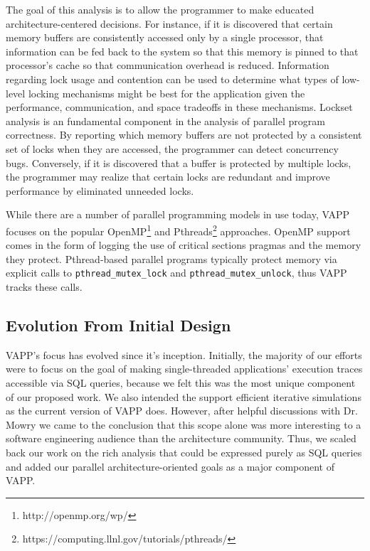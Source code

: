 The goal of this analysis is to allow the programmer to make
educated architecture-centered decisions.  For instance, if
it is discovered that certain memory buffers are consistently
accessed only by a single processor, that information can be
fed back to the system so that this memory is pinned to that
processor's cache so that communication overhead is reduced.
Information regarding lock usage and contention can be
used to determine what types of low-level locking mechanisms
might be best for the application given the performance, 
communication, and space tradeoffs in these mechanisms.
Lockset analysis is an fundamental component in the analysis
of parallel program correctness.  By reporting which
memory buffers are not protected by a consistent set of locks
when they are accessed, the programmer can detect concurrency
bugs.  Conversely, if it is discovered that a buffer is
protected by multiple locks, the programmer may realize that
certain locks are redundant and improve performance by eliminated
unneeded locks.

While there are a number of parallel programming models in use today,
VAPP focuses on the popular OpenMP\footnote{http://openmp.org/wp/}
and Pthreads\footnote{https://computing.llnl.gov/tutorials/pthreads/}
approaches.  OpenMP support comes in the form of logging
the use of critical sections pragmas and the memory they protect.
Pthread-based parallel programs typically protect memory
via explicit calls to \texttt{pthread\_mutex\_lock} and
\texttt{pthread\_mutex\_unlock}, thus VAPP tracks these calls.


\subsection{Evolution From Initial Design}
VAPP's focus has evolved since it's inception.  Initially, the
majority of our efforts were to focus on the goal of making
single-threaded applications' execution traces accessible via
SQL queries, because we felt this was the most unique component
of our proposed work.  We also intended the support
efficient iterative simulations as the current version of VAPP does.
However, after helpful discussions with Dr. Mowry we came to
the conclusion that this scope alone was more interesting
to a software engineering audience than the architecture community.
Thus, we scaled back our work on the rich analysis that could be
expressed purely as SQL queries and added our parallel architecture-oriented
goals as a major component of VAPP.

